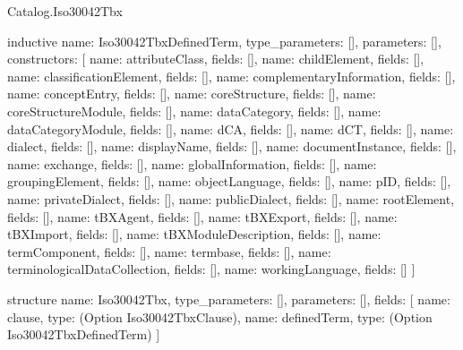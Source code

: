 \begin{lexlean}{Catalog.Iso30042Tbx}
\begin{semanticmodule}
inductive{
  name: Iso30042TbxDefinedTerm,
  type_parameters: [],
  parameters: [],
  constructors: [
    {name: attributeClass, fields: []},
    {name: childElement, fields: []},
    {name: classificationElement, fields: []},
    {name: complementaryInformation, fields: []},
    {name: conceptEntry, fields: []},
    {name: coreStructure, fields: []},
    {name: coreStructureModule, fields: []},
    {name: dataCategory, fields: []},
    {name: dataCategoryModule, fields: []},
    {name: dCA, fields: []},
    {name: dCT, fields: []},
    {name: dialect, fields: []},
    {name: displayName, fields: []},
    {name: documentInstance, fields: []},
    {name: exchange, fields: []},
    {name: globalInformation, fields: []},
    {name: groupingElement, fields: []},
    {name: objectLanguage, fields: []},
    {name: pID, fields: []},
    {name: privateDialect, fields: []},
    {name: publicDialect, fields: []},
    {name: rootElement, fields: []},
    {name: tBXAgent, fields: []},
    {name: tBXExport, fields: []},
    {name: tBXImport, fields: []},
    {name: tBXModuleDescription, fields: []},
    {name: termComponent, fields: []},
    {name: termbase, fields: []},
    {name: terminologicalDataCollection, fields: []},
    {name: workingLanguage, fields: []}
  ]
}

structure{
  name: Iso30042Tbx,
  type_parameters: [],
  parameters: [],
  fields: [
    {name: clause, type: (Option Iso30042TbxClause)},
    {name: definedTerm, type: (Option Iso30042TbxDefinedTerm)}
  ]
}
\end{semanticmodule}
\end{lexlean}
